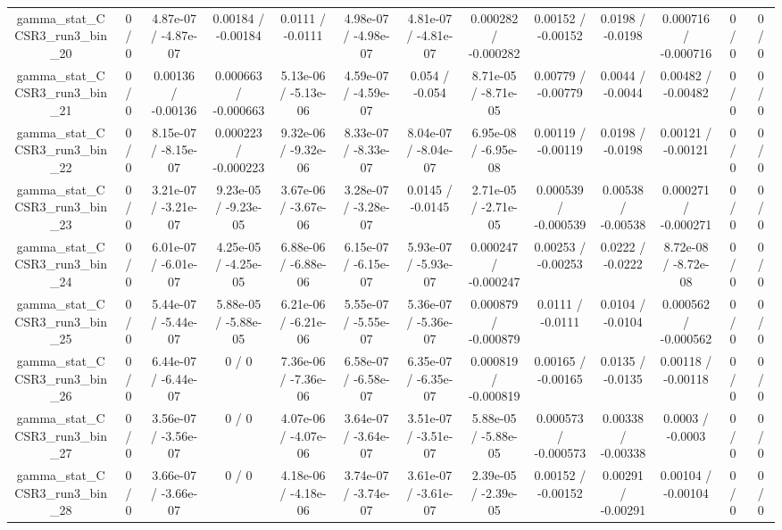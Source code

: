 \documentclass[10pt]{article}
\begin{document}
\begin{table}[htbp]
\begin{center}
\begin{tabular}{|c|c|c|c|c|c|c|c|c|c|c|c|c|}
  gamma_stat_CCSR3_run3_bin_20 & 0 / 0 & 4.87e-07 / -4.87e-07 & 0.00184 / -0.00184 & 0.0111 / -0.0111 & 4.98e-07 / -4.98e-07 & 4.81e-07 / -4.81e-07 & 0.000282 / -0.000282 & 0.00152 / -0.00152 & 0.0198 / -0.0198 & 0.000716 / -0.000716 & 0 / 0 & 0 / 0 \\ 
  gamma_stat_CCSR3_run3_bin_21 & 0 / 0 & 0.00136 / -0.00136 & 0.000663 / -0.000663 & 5.13e-06 / -5.13e-06 & 4.59e-07 / -4.59e-07 & 0.054 / -0.054 & 8.71e-05 / -8.71e-05 & 0.00779 / -0.00779 & 0.0044 / -0.0044 & 0.00482 / -0.00482 & 0 / 0 & 0 / 0 \\ 
  gamma_stat_CCSR3_run3_bin_22 & 0 / 0 & 8.15e-07 / -8.15e-07 & 0.000223 / -0.000223 & 9.32e-06 / -9.32e-06 & 8.33e-07 / -8.33e-07 & 8.04e-07 / -8.04e-07 & 6.95e-08 / -6.95e-08 & 0.00119 / -0.00119 & 0.0198 / -0.0198 & 0.00121 / -0.00121 & 0 / 0 & 0 / 0 \\ 
  gamma_stat_CCSR3_run3_bin_23 & 0 / 0 & 3.21e-07 / -3.21e-07 & 9.23e-05 / -9.23e-05 & 3.67e-06 / -3.67e-06 & 3.28e-07 / -3.28e-07 & 0.0145 / -0.0145 & 2.71e-05 / -2.71e-05 & 0.000539 / -0.000539 & 0.00538 / -0.00538 & 0.000271 / -0.000271 & 0 / 0 & 0 / 0 \\ 
  gamma_stat_CCSR3_run3_bin_24 & 0 / 0 & 6.01e-07 / -6.01e-07 & 4.25e-05 / -4.25e-05 & 6.88e-06 / -6.88e-06 & 6.15e-07 / -6.15e-07 & 5.93e-07 / -5.93e-07 & 0.000247 / -0.000247 & 0.00253 / -0.00253 & 0.0222 / -0.0222 & 8.72e-08 / -8.72e-08 & 0 / 0 & 0 / 0 \\ 
  gamma_stat_CCSR3_run3_bin_25 & 0 / 0 & 5.44e-07 / -5.44e-07 & 5.88e-05 / -5.88e-05 & 6.21e-06 / -6.21e-06 & 5.55e-07 / -5.55e-07 & 5.36e-07 / -5.36e-07 & 0.000879 / -0.000879 & 0.0111 / -0.0111 & 0.0104 / -0.0104 & 0.000562 / -0.000562 & 0 / 0 & 0 / 0 \\ 
  gamma_stat_CCSR3_run3_bin_26 & 0 / 0 & 6.44e-07 / -6.44e-07 & 0 / 0 & 7.36e-06 / -7.36e-06 & 6.58e-07 / -6.58e-07 & 6.35e-07 / -6.35e-07 & 0.000819 / -0.000819 & 0.00165 / -0.00165 & 0.0135 / -0.0135 & 0.00118 / -0.00118 & 0 / 0 & 0 / 0 \\ 
  gamma_stat_CCSR3_run3_bin_27 & 0 / 0 & 3.56e-07 / -3.56e-07 & 0 / 0 & 4.07e-06 / -4.07e-06 & 3.64e-07 / -3.64e-07 & 3.51e-07 / -3.51e-07 & 5.88e-05 / -5.88e-05 & 0.000573 / -0.000573 & 0.00338 / -0.00338 & 0.0003 / -0.0003 & 0 / 0 & 0 / 0 \\ 
  gamma_stat_CCSR3_run3_bin_28 & 0 / 0 & 3.66e-07 / -3.66e-07 & 0 / 0 & 4.18e-06 / -4.18e-06 & 3.74e-07 / -3.74e-07 & 3.61e-07 / -3.61e-07 & 2.39e-05 / -2.39e-05 & 0.00152 / -0.00152 & 0.00291 / -0.00291 & 0.00104 / -0.00104 & 0 / 0 & 0 / 0 \\ 

\end{tabular}
\end{center}
\end{table}
\end{document}
